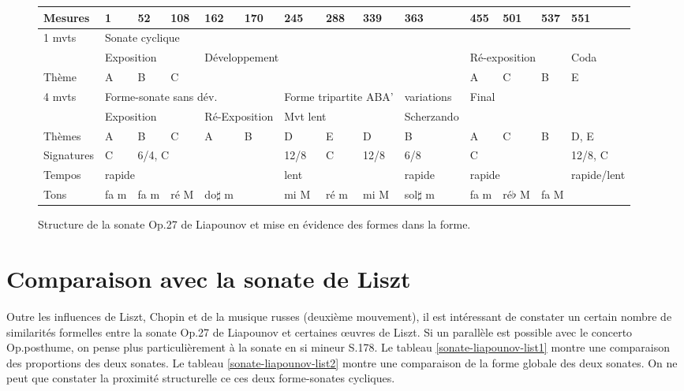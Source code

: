 \begin{figure}[!p]
  \begin{bigcenter}
    \vspace{-1cm}
     {
\begin{tabular}{|l|l|l|l|l|l|l|l|l|l|l|l|l|l|}
 \hline
   Mesures & 1 & 52 & 108 & 162 & 170 & 245 & 288 & 339 & 363 & 455 & 501 & 537 & 551 \\
 \hline
 \hline
   1 mvts & \multicolumn{13}{|l|}{Sonate cyclique}\\
 \hline
          & \multicolumn{3}{|l|}{Exposition} & \multicolumn{6}{l|}{Développement} & \multicolumn{3}{l|}{Ré-exposition} & Coda\\
 \hline
   Thème & A & B & C & \multicolumn{6}{l|}{} & A & C & B & E\\
 \hline
 \hline
   4 mvts & \multicolumn{5}{|l|}{Forme-sonate sans dév.} & \multicolumn{3}{|l|}{Forme tripartite ABA'} & variations & \multicolumn{4}{|l|}{Final}\\
 \hline
          & \multicolumn{3}{|l|}{Exposition} & \multicolumn{2}{l|}{Ré-Exposition} & \multicolumn{3}{l|}{Mvt lent} & Scherzando & \multicolumn{4}{l|}{}\\
 \hline
  Thèmes & A & B & C & A & B & D & E & D & B & A & C & B & D, E\\
 \hline
 \hline
  Signatures & C & \multicolumn{4}{|l|}{6/4, C} & 12/8 & C & 12/8 & 6/8 & \multicolumn{3}{|l|}{C} & 12/8, C\\
 \hline
  Tempos & \multicolumn{5}{|l|}{rapide} & \multicolumn{3}{|l|}{lent} & rapide & \multicolumn{3}{|l|}{rapide} & rapide/lent\\
 \hline
  Tons & fa m & fa m & ré M & \multicolumn{2}{|l|}{do$\sharp$ m} & mi M & ré m & mi M & sol$\sharp$ m & fa m & ré$\flat$ M & \multicolumn{2}{|l|}{fa M}\\
 \hline
\end{tabular}
    }
  \end{bigcenter}
  \caption{\label{structure}Structure de la sonate Op.27 de Liapounov et mise en évidence des formes dans la forme.}
\end{figure}

\section{Comparaison avec la sonate de Liszt}

Outre les influences de Liszt, Chopin et de la musique russes (deuxième mouvement), il est intéressant de constater un certain nombre de similarités formelles entre la sonate Op.27 de Liapounov et certaines œuvres de Liszt. Si un parallèle est possible avec le concerto Op.posthume, on pense plus particulièrement à la sonate en si mineur S.178. Le tableau \ref{sonate-liapounov-list1} montre une comparaison des proportions des deux sonates. Le tableau \ref{sonate-liapounov-list2} montre une comparaison de la forme globale des deux sonates. On ne peut que constater la proximité structurelle ce ces deux forme-sonates cycliques.

